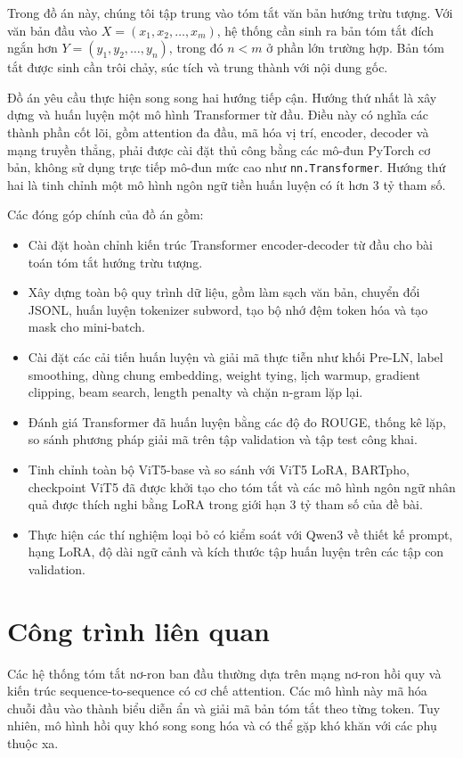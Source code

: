 \documentclass[conference]{IEEEtran}
\begin{document}
Trong đồ án này, chúng tôi tập trung vào tóm tắt văn bản hướng trừu tượng. Với văn bản đầu vào $X = (x_1, x_2, \ldots, x_m)$, hệ thống cần sinh ra bản tóm tắt đích ngắn hơn $Y = (y_1, y_2, \ldots, y_n)$, trong đó $n < m$ ở phần lớn trường hợp. Bản tóm tắt được sinh cần trôi chảy, súc tích và trung thành với nội dung gốc.

Đồ án yêu cầu thực hiện song song hai hướng tiếp cận. Hướng thứ nhất là xây dựng và huấn luyện một mô hình Transformer từ đầu. Điều này có nghĩa các thành phần cốt lõi, gồm attention đa đầu, mã hóa vị trí, encoder, decoder và mạng truyền thẳng, phải được cài đặt thủ công bằng các mô-đun PyTorch cơ bản, không sử dụng trực tiếp mô-đun mức cao như \texttt{nn.Transformer}. Hướng thứ hai là tinh chỉnh một mô hình ngôn ngữ tiền huấn luyện có ít hơn 3 tỷ tham số.

Các đóng góp chính của đồ án gồm:
\begin{itemize}
    \item Cài đặt hoàn chỉnh kiến trúc Transformer encoder-decoder từ đầu cho bài toán tóm tắt hướng trừu tượng.
    \item Xây dựng toàn bộ quy trình dữ liệu, gồm làm sạch văn bản, chuyển đổi JSONL, huấn luyện tokenizer subword, tạo bộ nhớ đệm token hóa và tạo mask cho mini-batch.
    \item Cài đặt các cải tiến huấn luyện và giải mã thực tiễn như khối Pre-LN, label smoothing, dùng chung embedding, weight tying, lịch warmup, gradient clipping, beam search, length penalty và chặn n-gram lặp lại.
    \item Đánh giá Transformer đã huấn luyện bằng các độ đo ROUGE, thống kê lặp, so sánh phương pháp giải mã trên tập validation và tập test công khai.
    \item Tinh chỉnh toàn bộ ViT5-base và so sánh với ViT5 LoRA, BARTpho, checkpoint ViT5 đã được khởi tạo cho tóm tắt và các mô hình ngôn ngữ nhân quả được thích nghi bằng LoRA trong giới hạn 3 tỷ tham số của đề bài.
    \item Thực hiện các thí nghiệm loại bỏ có kiểm soát với Qwen3 về thiết kế prompt, hạng LoRA, độ dài ngữ cảnh và kích thước tập huấn luyện trên các tập con validation.
\end{itemize}

\section{Công trình liên quan}
Các hệ thống tóm tắt nơ-ron ban đầu thường dựa trên mạng nơ-ron hồi quy và kiến trúc sequence-to-sequence có cơ chế attention. Các mô hình này mã hóa chuỗi đầu vào thành biểu diễn ẩn và giải mã bản tóm tắt theo từng token. Tuy nhiên, mô hình hồi quy khó song song hóa và có thể gặp khó khăn với các phụ thuộc xa.
\end{document}
